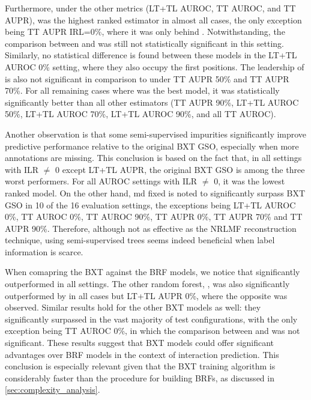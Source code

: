 Furthermore, under the other metrics (LT+TL AUROC, TT AUROC, and TT AUPR),  was the highest ranked estimator in almost all cases, the only exception being TT AUPR IRL=0\%, where it was only behind . Notwithstanding, the comparison between  and  was still not statistically significant in this setting. Similarly, no statistical difference is found between these models in the LT+TL AUROC 0\% setting, where they also occupy the first positions. The leadership of  is also not significant in comparison to  under TT AUPR 50\% and TT AUPR 70\%. For all remaining cases where  was the best model, it was statistically significantly better than all other estimators (TT AUPR 90\%, LT+TL AUROC 50\%, LT+TL AUROC 70\%, LT+TL AUROC 90\%, and all TT AUROC).


Another observation is that some semi-supervised impurities significantly improve predictive performance relative to the original BXT GSO, especially when more annotations are missing. This conclusion is based on the fact that, in all settings with ILR $\neq$ 0 except LT+TL AUPR, the original BXT GSO is among the three worst performers. For all AUROC settings with ILR $\neq$ 0, it was the lowest ranked model. On the other hand, md fixed is noted to significantly surpass BXT GSO in 10 of the 16 evaluation settings, the exceptions being LT+TL AUROC 0\%, TT AUROC 0\%, TT AUROC 90\%, TT AUPR 0\%, TT AUPR 70\% and TT AUPR 90\%. Therefore, although not as effective as the NRLMF reconstruction technique, using semi-supervised trees seems indeed beneficial when label information is scarce.


When comapring the BXT against the BRF models, we notice that  significantly outperformed  in all settings. The other random forest, , was also significantly outperformed by  in all cases but LT+TL AUPR 0\%, where the opposite was observed. Similar results hold for the other BXT models as well: they significantly surpassed  in the vast majority of test configurations, with the only exception being TT AUROC 0\%, in which the comparison between  and  was not significant. These results suggest that BXT models could offer significant advantages over BRF models in the context of interaction prediction. This conclusion is especially relevant given that the BXT training algorithm is considerably faster than the procedure for building BRFs, as discussed in \autoref{sec:complexity_analysis}.

